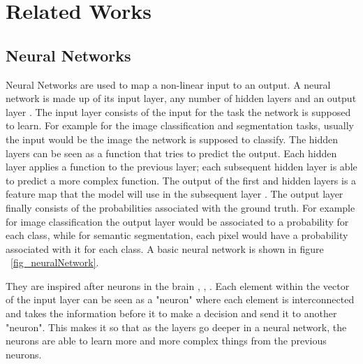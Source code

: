 \chapter{Related Works}


\section{Neural Networks}
    Neural Networks are used to map a non-linear input to an output. 
    A neural network is made up of its input layer, any number of hidden layers and an output layer \cite{DeepLearning2015}. 
    The input layer consists of the input for the task the network is supposed to learn. 
    For example for the image classification and segmentation tasks, usually the input would be the image the network is supposed to classify. 
    The hidden layers can be seen as a function that tries to predict the output. 
    Each hidden layer applies a function to the previous layer; each subsequent hidden layer is able to predict a more complex function.
    The output of the first and hidden layers is a feature map that the model will use in the subsequent layer \cite{Goodfellow-et-al-2016}. 
    The output layer finally consists of the probabilities associated with the ground truth. 
    For example for image classification the output layer would be associated to a probability for each class, while for semantic segmentation, each pixel would have a probability associated with it for each class. 
    A basic neural network is shown in figure ~\ref{fig_neuralNetwork}. 
    \par
    They are inspired after neurons in the brain \cite{DeepLearning2015}, \cite{Goodfellow-et-al-2016}, \cite{10.1371/journal.pcbi.Neurons}. 
    Each element within the vector of the input layer can be seen as a "neuron" where each element is interconnected and takes the information before it to make a decision and send it to another "neuron". 
    This makes it so that as the layers go deeper in a neural network, the neurons are able to learn more and more complex things from the previous neurons.
    
